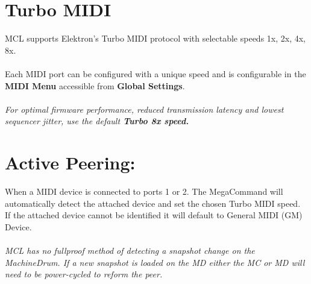 \section{Turbo MIDI}

MCL supports Elektron's Turbo MIDI protocol with selectable speeds 1x, 2x, 4x, 8x.\\
\\
Each MIDI port can be configured with a unique speed and is configurable in the \textbf{MIDI Menu} accessible from \textbf{Global Settings}.
\\
\\
\textit{For optimal firmware performance, reduced transmission latency and lowest sequencer jitter, use the default \textbf{Turbo 8x speed.}}

\section{Active Peering:}

When a MIDI device is connected to ports 1 or 2. The MegaCommand will automatically detect the attached device and set the chosen Turbo MIDI speed. If the attached device cannot be identified it will default to General MIDI (GM) Device.\\
\\
\textit{MCL has no fullproof method of detecting a snapshot change on the MachineDrum. If a new snapshot is loaded on the MD either the MC or MD will need to be power-cycled to reform the peer.}


 
